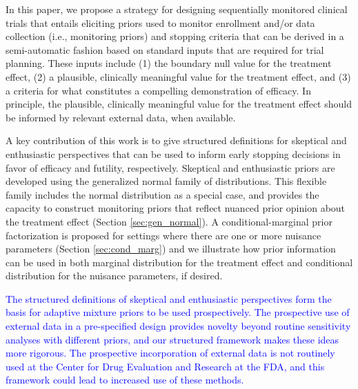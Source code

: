 \documentclass[AMA,STIX1COL,doublespace]{WileyNJD-v2}
\begin{document}
In this paper, we propose a strategy for designing sequentially monitored clinical trials that entails eliciting 
priors used to monitor enrollment and/or data collection (i.e., monitoring priors) and stopping criteria that can 
be derived in a semi-automatic fashion based on standard inputs that are required for trial planning. 
%
These inputs include (1) the boundary null value for the treatment effect, (2) a plausible, clinically meaningful 
value for the treatment effect, and (3) a criteria for what constitutes a compelling demonstration of efficacy. 
%
In principle, the plausible, clinically meaningful value for the treatment effect should be informed by relevant external data, when available. 


A key contribution of this work is to give structured definitions for skeptical and enthusiastic perspectives that can be used 
to inform early stopping decisions in favor of efficacy and futility, respectively. Skeptical and enthusiastic priors are developed using the generalized normal family of distributions. 
This flexible family includes the normal distribution as a special case, and provides the capacity to construct monitoring 
priors that reflect nuanced prior opinion about the treatment effect (Section \ref{sec:gen_normal}). 
A conditional-marginal prior factorization is proposed for settings where there are one or more nuisance 
parameters (Section \ref{sec:cond_marg}) and we illustrate how prior information can be used in both marginal 
distribution for the treatment effect and conditional distribution for the nuisance parameters, if desired. 

\textcolor{blue}{The structured definitions of skeptical and enthusiastic perspectives form the basis for adaptive mixture priors to be used prospectively. The prospective use of external data in a pre-specified design provides novelty beyond routine sensitivity analyses with different priors, and our structured framework makes these ideas more rigorous. The prospective incorporation of external data is not routinely used at the Center for Drug Evaluation and Research at the FDA, and this framework could lead to increased use of these methods.}
\end{document}
